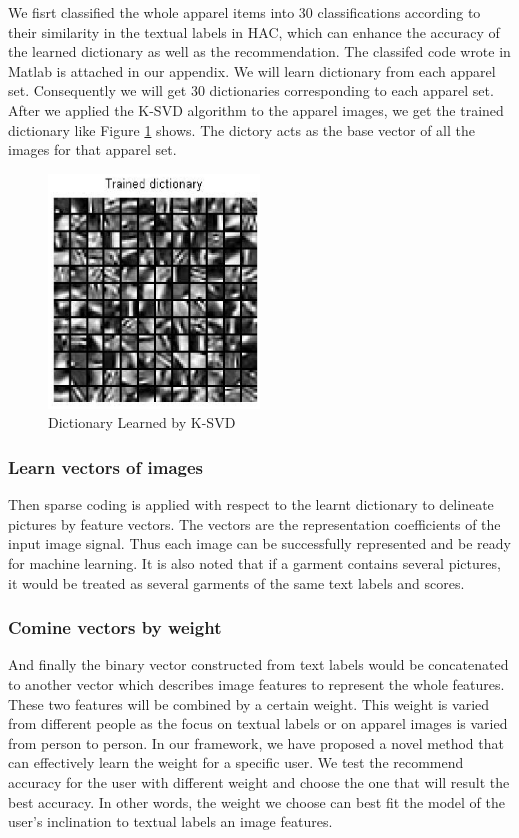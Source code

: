 We fisrt classified the whole apparel items into 30 classifications according to their similarity in the textual labels in HAC, which can enhance the accuracy of the learned dictionary as well as the recommendation. The classifed code wrote in Matlab is attached in our appendix. We will learn dictionary from each apparel set. Consequently we will get 30 dictionaries corresponding to each apparel set. After we applied the K-SVD algorithm to the apparel images, we get the trained dictionary like Figure \ref{fig:dict} shows. The dictory acts as the base vector of all the images for that apparel set.


\begin{figure}
  \centering
  \includegraphics[width=0.5\textwidth]{Trained_dic}
  \caption{Dictionary Learned by K-SVD}
  \label{fig:dict}
\end{figure}


\subsubsection{Learn vectors of images}
Then sparse coding is applied with respect to the learnt dictionary to delineate pictures by feature vectors. The vectors are the representation coefficients of the input image signal. Thus each image can be successfully represented and be ready for machine learning. It is also noted that if a garment contains several pictures, it would be treated as several garments of the same text labels and scores.
  
\subsubsection{Comine vectors by weight}
And finally the binary vector constructed from text labels would be concatenated to another vector which describes image features to represent the whole features. These two features will be combined by a certain weight. This weight is varied from different people as the focus on textual labels or on apparel images is varied from person to person. In our framework, we have proposed a novel method that can effectively learn the weight for a specific user. We test the recommend accuracy for the user with different weight and choose the one that will result the best accuracy. In other words, the weight we choose can best fit the model of the user's inclination to textual labels an image features.

